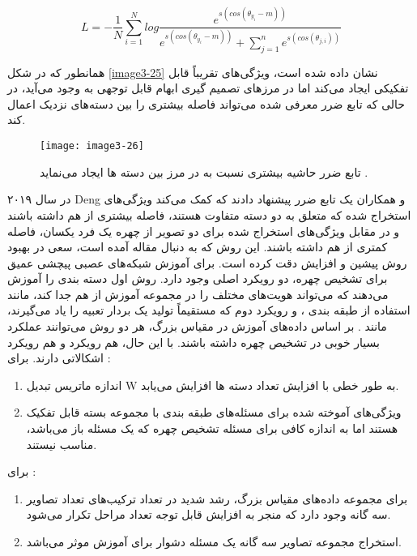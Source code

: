 \begin{equation}
\label{eq3-13}
L = - \frac{1}{N} \sum_{i=1}^{N} log \frac{e^{s(cos(\theta_{y_i}-m))}}{e^{s(cos(\theta_{y_i}-m))} + \sum_{j=1}^{n} e^{s(cos(\theta_{j, i}))}}
\end{equation}

\noindent
همانطور که در شکل \ref{image3-25} نشان داده شده است،  ویژگی‌های تقریباً قابل تفکیکی ایجاد می‌کند اما در مرزهای تصمیم گیری ابهام قابل توجهی به وجود می‌آید، در حالی که تابع ضرر معرفی شده می‌تواند فاصله بیشتری را بین دسته‌های نزدیک اعمال کند.

\begin{figure}[h]
\centering
  \texttt{[image: image3-26]}
  \caption{تابع ضرر  حاشیه بیشتری نسبت به  در مرز بین دسته ها ایجاد می‌نماید \cite{wang2018cosface}.}
  \label{image3-26}
\end{figure}

\noindent
در سال ۲۰۱۹ Deng و همکاران \cite{deng2019arcface} یک تابع ضرر پیشنهاد دادند که کمک می‌کند ویژگی‌های استخراج شده که متعلق به دو دسته متفاوت هستند، فاصله بیشتری از هم داشته باشند و در مقابل ویژگی‌های استخراج شده برای دو تصویر از چهره یک فرد یکسان، فاصله کمتری از هم داشته باشند. این روش که به دنبال مقاله \cite{wang2018cosface} آمده است، سعی در بهبود روش پیشین و افزایش دقت کرده است. برای آموزش شبکه‌های عصبی پیچشی عمیق برای تشخیص چهره، دو رویکرد اصلی وجود دارد. روش اول دسته بندی را آموزش می‌دهند که می‌تواند هویت‌های مختلف را در مجموعه آموزش از هم جدا کند، مانند استفاده از طبقه بندی ، و رویکرد دوم که مستقیماً تولید یک بردار تعبیه  را یاد می‌گیرند، مانند . بر اساس داده‌های آموزش در مقیاس بزرگ، هر دو روش می‌توانند عملکرد بسیار خوبی در تشخیص چهره داشته باشند. با این حال، هم رویکرد  و هم رویکرد  اشکالاتی دارند.
\noindent
برای :
\begin{enumerate}
\item
	اندازه ماتریس تبدیل W به طور خطی با افزایش تعداد دسته ها  افزایش می‌یابد.‌
\item 
	ویژگی‌های آموخته شده برای مسئله‌های طبقه بندی با مجموعه بسته قابل تفکیک هستند اما به اندازه کافی برای مسئله تشخیص چهره که یک مسئله باز می‌باشد، مناسب نیستند. 
\end{enumerate}

\noindent
برای :
\begin{enumerate}
\item
	برای مجموعه داده‌های مقیاس بزرگ، رشد شدید در تعداد ترکیب‌های تعداد تصاویر سه گانه وجود دارد که منجر به افزایش قابل توجه تعداد مراحل تکرار می‌شود.
\item 
	استخراج مجموعه تصاویر سه گانه یک مسئله دشوار برای آموزش موثر می‌باشد. 
\end{enumerate}

